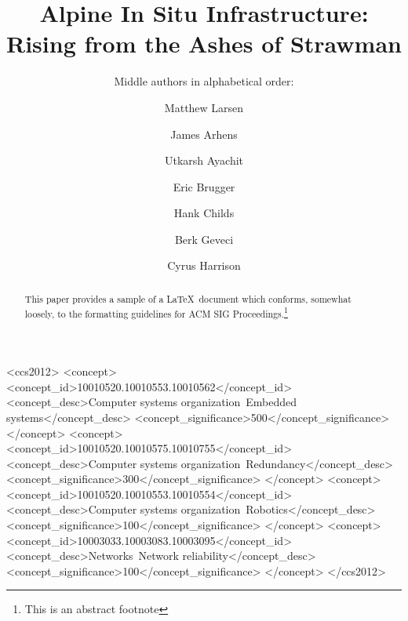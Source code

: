 \documentclass[sigconf]{acmart}
\begin{document}
\title{Alpine In Situ Infrastructure: Rising from the Ashes of Strawman}
\subtitle{Middle authors in alphabetical order:}

\author{Matthew Larsen}

\author{James Arhens}

\author{Utkarsh Ayachit}

\author{Eric Brugger}

\author{Hank Childs}

\author{Berk Geveci}

\author{Cyrus Harrison}



\renewcommand{\shortauthors}{Humans et al.}



\begin{abstract}
This paper provides a sample of a \LaTeX\ document which conforms,
somewhat loosely, to the formatting guidelines for
ACM SIG Proceedings.\footnote{This is an abstract footnote}
\end{abstract}

%
%
\begin{CCSXML}
<ccs2012>
 <concept>
  <concept_id>10010520.10010553.10010562</concept_id>
  <concept_desc>Computer systems organization~Embedded systems</concept_desc>
  <concept_significance>500</concept_significance>
 </concept>
 <concept>
  <concept_id>10010520.10010575.10010755</concept_id>
  <concept_desc>Computer systems organization~Redundancy</concept_desc>
  <concept_significance>300</concept_significance>
 </concept>
 <concept>
  <concept_id>10010520.10010553.10010554</concept_id>
  <concept_desc>Computer systems organization~Robotics</concept_desc>
  <concept_significance>100</concept_significance>
 </concept>
 <concept>
  <concept_id>10003033.10003083.10003095</concept_id>
  <concept_desc>Networks~Network reliability</concept_desc>
  <concept_significance>100</concept_significance>
 </concept>
</ccs2012>  
\end{CCSXML}
\end{document}
